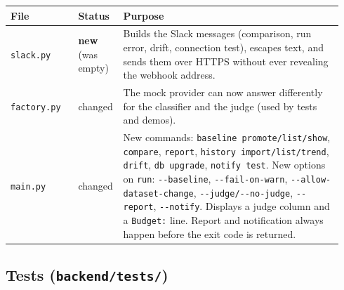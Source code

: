 \documentclass[11pt,a4paper]{article}
\newcommand{\code}[1]{\nolinkurl{#1}}
\newcommand{\new}{\textbf{new}}
\begin{document}
\begin{longtable}{@{}p{0.20\linewidth}p{0.09\linewidth}p{0.65\linewidth}@{}}
\toprule
\textbf{File} & \textbf{Status} & \textbf{Purpose} \\
\midrule
\endhead
\code{slack.py} & \new{} (was empty) & Builds the Slack messages (comparison, run error, drift, connection test), escapes text, and sends them over HTTPS without ever revealing the webhook address. \\
\code{factory.py} & changed & The mock provider can now answer differently for the classifier and the judge (used by tests and demos). \\
\code{main.py} & changed & {\raggedright New commands: \texttt{baseline promote/list/show}, \texttt{compare}, \texttt{report}, \texttt{history import/list/trend}, \texttt{drift}, \texttt{db upgrade}, \texttt{notify test}. New options on \texttt{run}: \texttt{-{}-baseline}, \texttt{-{}-fail-on-warn}, \texttt{-{}-allow-dataset-change}, \texttt{-{}-judge/-{}-no-judge}, \texttt{-{}-report}, \texttt{-{}-notify}. Displays a judge column and a \texttt{Budget:} line. Report and notification always happen before the exit code is returned.\par} \\
\bottomrule
\end{longtable}

\subsection{Tests (\texorpdfstring{\code{backend/tests/}}{backend/tests/})}
\end{document}
